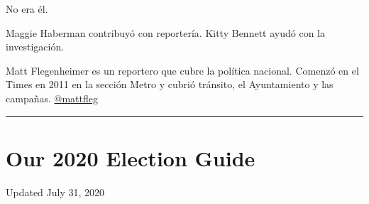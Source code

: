 No era él.

Maggie Haberman contribuyó con reportería. Kitty Bennett ayudó con la
investigación.

Matt Flegenheimer es un reportero que cubre la política nacional.
Comenzó en el Times en 2011 en la sección Metro y cubrió tránsito, el
Ayuntamiento y las campañas.
\href{https://twitter.com/mattfleg}{@mattfleg}

\begin{center}\rule{0.5\linewidth}{\linethickness}\end{center}

\hypertarget{our-2020-election-guide}{%
\section{Our 2020 Election Guide}\label{our-2020-election-guide}}

Updated July 31, 2020

